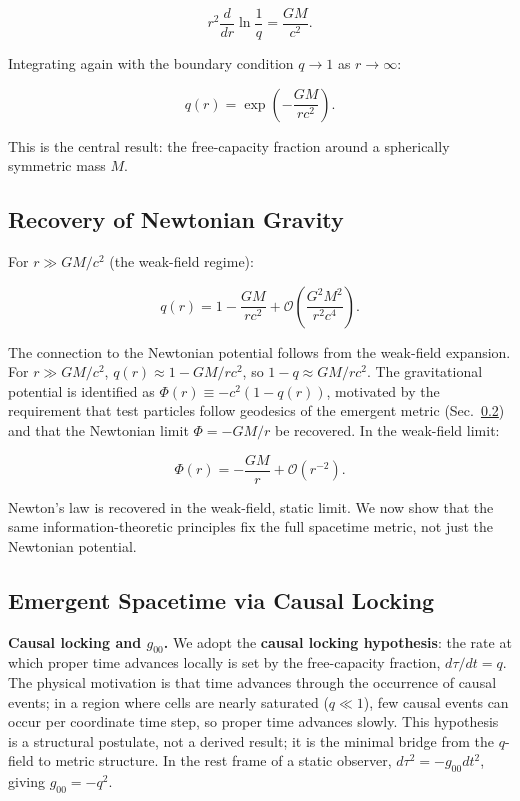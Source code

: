 \documentclass[aps,prd,twocolumn,showpacs,superscriptaddress,preprintnumbers]{revtex4-2}
\begin{document}
\begin{equation}
r^2 \frac{d}{dr}\ln\frac{1}{q} = \frac{GM}{c^2}.
\label{eq:first_int}
\end{equation}

Integrating again with the boundary condition $q\to1$ as $r\to\infty$:

\begin{equation}
\boxed{q(r) = \exp\left(-\frac{GM}{rc^2}\right)}.
\label{eq:q_solution}
\end{equation}

This is the central result: the free-capacity fraction around a spherically symmetric mass $M$.

\subsection{Recovery of Newtonian Gravity}

For $r\gg GM/c^2$ (the weak-field regime):

\begin{equation}
q(r) = 1 - \frac{GM}{rc^2} + \mathcal{O}\left(\frac{G^2 M^2}{r^2 c^4}\right).
\label{eq:q_expand}
\end{equation}

The connection to the Newtonian potential follows from the weak-field expansion. For $r\gg GM/c^2$, $q(r)\approx 1-GM/rc^2$, so $1-q \approx GM/rc^2$. The gravitational potential is identified as $\Phi(r) \equiv -c^2(1-q(r))$, motivated by the requirement that test particles follow geodesics of the emergent metric (Sec.~\ref{sec:metric}) and that the Newtonian limit $\Phi = -GM/r$ be recovered. In the weak-field limit:

\begin{equation}
\boxed{\Phi(r) = -\frac{GM}{r} + \mathcal{O}(r^{-2})}.
\label{eq:newton}
\end{equation}

Newton's law is recovered in the weak-field, static limit.
We now show that the same information-theoretic principles fix the full spacetime metric, not just the Newtonian potential.

\subsection{Emergent Spacetime via Causal Locking}
\label{sec:metric}

\textbf{Causal locking and $g_{00}$.}
We adopt the \textbf{causal locking hypothesis}: the rate at which proper time advances locally is set by the free-capacity fraction, $d\tau/dt = q$. The physical motivation is that time advances through the occurrence of causal events; in a region where cells are nearly saturated ($q \ll 1$), few causal events can occur per coordinate time step, so proper time advances slowly. This hypothesis is a structural postulate, not a derived result; it is the minimal bridge from the $q$-field to metric structure.
In the rest frame of a static observer, $d\tau^2 = -g_{00}dt^2$, giving $g_{00} = -q^2$.
\end{document}
